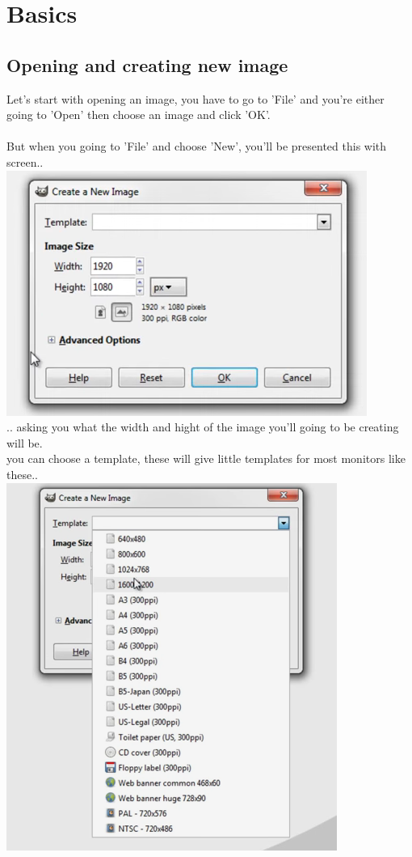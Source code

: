 \chapter{Basics}
\section{Opening and creating new image}
Let's start with opening an image, you have to go to 'File' and you're either going to 'Open' then choose an image and click 'OK'.\\
\\
But when you going to 'File' and choose 'New', you'll be presented this with screen..\\
\includegraphics{new} \\
.. asking you what the width and hight of the image you'll going to be creating will be.\\
you can choose a template, these will give little templates for most monitors like these..\\
\includegraphics{template} \\
